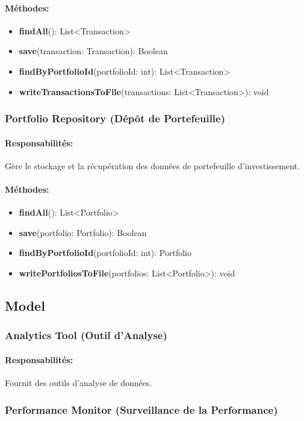 \documentclass{article}
\begin{document}
\paragraph{Méthodes:}
\begin{itemize}
  \item \textbf{findAll}(): List<Transaction>
  \item \textbf{save}(transaction: Transaction): Boolean
  \item \textbf{findByPortfolioId}(portfolioId: int): List<Transaction>
  \item \textbf{writeTransactionsToFile}(transactions: List<Transaction>): void
\end{itemize}
\subsubsection{Portfolio Repository (Dépôt de Portefeuille)}
\paragraph{Responsabilités:} Gère le stockage et la récupération des données de portefeuille d'investissement.
\paragraph{Méthodes:}
\begin{itemize}
  \item \textbf{findAll}(): List<Portfolio>
  \item \textbf{save}(portfolio: Portfolio): Boolean
  \item \textbf{findByPortfolioId}(portfolioId: int): Portfolio
  \item \textbf{writePortfoliosToFile}(portfolios: List<Portfolio>): void
\end{itemize}
\subsection{Model}
\subsubsection{Analytics Tool (Outil d'Analyse)}
\paragraph{Responsabilités:} Fournit des outils d'analyse de données.
\subsubsection{Performance Monitor (Surveillance de la Performance)}
\end{document}
